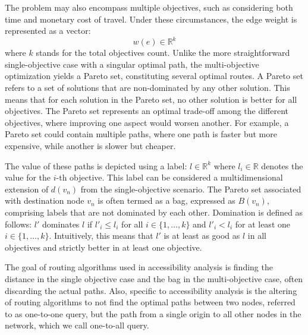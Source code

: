The problem may also encompass multiple objectives, such as considering both time and monetary cost of travel.
Under these circumstances, the edge weight is represented as a vector:
\[ w(e) \in \mathbb{R}^k \]
where \( k \) stands for the total objectives count.
Unlike the more straightforward single-objective case with a singular optimal path, the multi-objective optimization yields a Pareto set, constituting several optimal routes.
A Pareto set refers to a set of solutions that are non-dominated by any other solution.
This means that for each solution in the Pareto set, no other solution is better for all objectives.
The Pareto set represents an optimal trade-off among the different objectives, where improving one aspect would worsen another.
For example, a Pareto set could contain multiple paths, where one path is faster but more expensive, while another is slower but cheaper.

The value of these paths is depicted using a label: \( l \in \mathbb{R}^k \) where \( l_i \in \mathbb{R} \) denotes the value for the \( i \)-th objective.
This label can be considered a multidimensional extension of \( d(v_n) \) from the single-objective scenario.
The Pareto set associated with destination node \( v_n \) is often termed as a bag, expressed as \( B(v_n) \), comprising labels that are not dominated by each other.
Domination is defined as follows: \( l' \) dominates \( l \) if \( l'_i \leq l_i \) for all \( i \in \{1, \dots, k\} \) and \( l'_i < l_i \) for at least one \( i \in \{1, \dots, k\} \).
Intuitively, this means that \(l' \) is at least as good as \( l \) in all objectives and strictly better in at least one objective.

The goal of routing algorithms used in accessibility analysis is finding the distance in the single objective case and the bag in the multi-objective case, often discarding the actual paths.
Also, specific to accessibility analysis is the altering of routing algorithms to not find the optimal paths between two nodes, referred to as one-to-one query, but the path from a single origin to all other nodes in the network, which we call one-to-all query.

